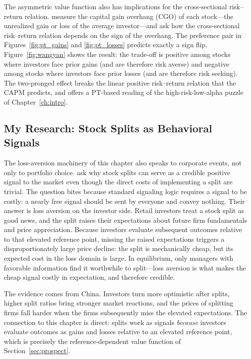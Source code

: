 The asymmetric value function also has implications for the cross-sectional risk--return relation. \citet{wang2016} measure the capital gain overhang (CGO) of each stock---the unrealized gain or loss of the average investor---and ask how the cross-sectional risk--return relation depends on the sign of the overhang. The preference pair in Figures~\ref{fig:pt_gains} and \ref{fig:pt_losses} predicts exactly a sign flip. Figure~\ref{fig:wangyan} shows the result: the trade-off is positive among stocks where investors face prior gains (and are therefore risk averse) and negative among stocks where investors face prior losses (and are therefore risk seeking). The two-pronged effect breaks the linear positive risk--return relation that the CAPM predicts, and offers a PT-based reading of the high-risk-low-alpha puzzle of Chapter~\ref{ch:intro}.

\subsection{My Research: Stock Splits as Behavioral Signals}
\label{sec:splits}

The loss-aversion machinery of this chapter also speaks to corporate events, not only to portfolio choice. \citet{licuipangxie} ask why stock splits can serve as a credible positive signal to the market even though the direct costs of implementing a split are trivial. The question bites because standard signaling logic requires a signal to be costly: a nearly free signal should be sent by everyone and convey nothing. Their answer is loss aversion on the investor side. Retail investors treat a stock split as good news, and the split raises their expectations about future firm fundamentals and price appreciation. Because investors evaluate subsequent outcomes relative to that elevated reference point, missing the raised expectations triggers a disproportionately large price decline: the split is mechanically cheap, but its expected cost in the loss domain is large. In equilibrium, only managers with favorable information find it worthwhile to split---loss aversion is what makes the cheap signal costly in expectation, and therefore credible.

The evidence comes from China. Investors turn more optimistic after splits, higher split ratios bring stronger market reactions, and the prices of splitting firms fall harder when the firms subsequently miss the elevated expectations. The connection to this chapter is direct: splits work as signals \emph{because} investors evaluate outcomes as gains and losses relative to an elevated reference point, which is precisely the reference-dependent value function of Section~\ref{sec:prospect}.

